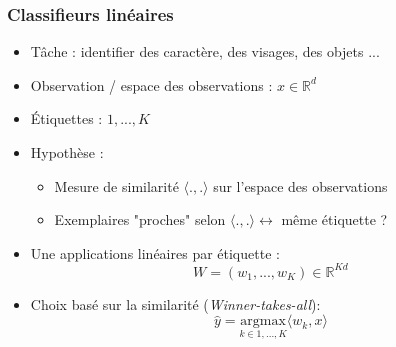 \documentclass{beamer}
\begin{document}
\begin{frame}
	\frametitle{Classifieurs linéaires}
	\begin{itemize}
		\item Tâche : identifier des caractère, des visages, des objets ...
		\item Observation / espace des observations : $x \in \mathbb{R}^d $ 
		\item Étiquettes : $1,...,K$
		\item Hypothèse : 
		\begin{itemize}
			\item Mesure de similarité $\langle .,. \rangle$ sur l'espace des observations 
			\item Exemplaires "proches" selon $\langle .,. \rangle \leftrightarrow$ même étiquette ?
		\end{itemize}
		\item Une applications linéaires par étiquette :
		$$ W = (w_1, ..., w_K) \in \mathbb{R}^{Kd}$$
		\item Choix basé sur la similarité (\textit{Winner-takes-all}):
		$$ \hat{y} = \underset{k \in 1,...,K}{\text{argmax}}\langle w_k,x\rangle$$
	\end{itemize}
\end{frame}
\end{document}
